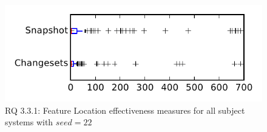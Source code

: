 
\begin{figure}
\centering
\includegraphics[height=0.4\textheight]{figures/flt_seed/rq1_tiny_22}
\caption{RQ 3.3.1: Feature Location effectiveness measures for all subject systems with $seed=22$}
\label{fig:flt_seed:rq1:tiny}
\end{figure}
